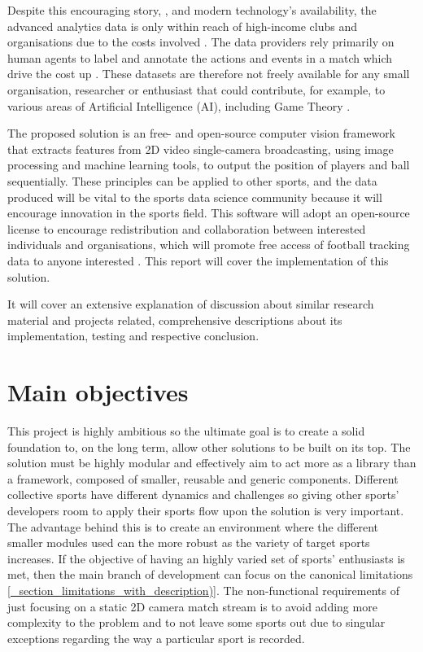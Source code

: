 \documentclass[
11pt,
twoside
]{report}
\begin{document}
Despite this encouraging story, \cite{liverpool}, and modern technology's availability, the advanced analytics data is only within reach of high-income clubs and organisations due to the costs involved \cite{opta}. The data providers rely primarily on human agents to label and annotate the actions and events in a match which drive the cost up \cite{opta}. These datasets are therefore not freely available for any small organisation, researcher or enthusiast that could contribute, for example, to various areas of Artificial Intelligence (AI), including Game Theory \cite{deepmind}.


The proposed solution is an free- and open-source computer vision framework that extracts features from 2D video single-camera broadcasting, using image processing and machine learning tools, to output the position of players and ball sequentially. These principles can be applied to other sports, and the data produced will be vital to the sports data science community because it will encourage innovation in the sports field. This software will adopt an open-source license to encourage redistribution and collaboration between interested individuals and organisations, which will promote free access of football tracking data to anyone interested \cite{osd}.  This report will cover the implementation of this solution.


It will cover an extensive explanation of  discussion about similar research material and projects related, comprehensive descriptions about its implementation, testing and respective conclusion.



\section{Main objectives}


This project is highly ambitious so the ultimate goal is to create a solid foundation to, on the long term, allow other solutions to be built on its top. The solution must be highly modular and effectively aim to act more as a library than a framework, composed of smaller, reusable and generic components. Different collective sports have different dynamics and challenges so giving other sports' developers room to apply their sports flow upon the solution is very important. The advantage behind this is to create an environment where the different smaller modules used can the more robust as the variety of target sports increases. If the objective of having an highly varied set of sports' enthusiasts is met, then the main branch of development can focus on the canonical limitations \ref{_section_limitations_with_description)}. The non-functional requirements of just focusing on a static 2D camera match stream is to avoid adding more complexity to the problem and to not leave some sports out due to singular exceptions regarding the way a particular sport is recorded.
\end{document}
